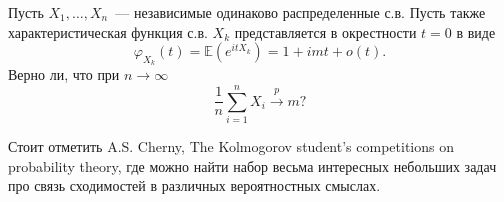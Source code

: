 \begin{problem}

Пусть $X_1,\ldots,X_n$~--- независимые одинаково распределенные с.в. Пусть также характеристическая функция с.в. $X_k$ представляется 
в окрестности $t=0$ в виде 
$$
\varphi_{X_k}(t)={\mathbb E}(e^{it X_k})=1+imt+o(t). 
$$
 Верно ли, что при $n\to\infty$ 
$$
\frac{1}{n}\sum\limits_{i=1}^{n} X_i \xrightarrow{p} m?
$$
\end{problem}
\begin{remark}
Стоит отметить A.S. Cherny, The Kolmogorov student's competitions on probability theory, где можно найти набор весьма интересных небольших задач про связь сходимостей в различных вероятностных смыслах.
\end{remark}

\begin{comment}
\begin{problem}
Пусть $x_1, x_2, x_3, \ldots$~--- последовательность независимых одинаково распределенных с.в. Положим 
$S_n=\sum\limits_{k=1}^{n} x_k$. Покажите, что 

\begin{enumerate}
\item(з.б.ч.) если ${\mathbb E}(|x_k|)<\infty$, то $S_n/n\xrightarrow{P} m$ при $n\to\infty$, где $m={\mathbb E}(x_k)$; 

\item(ц.п.т.) если ${\mathbb E}(x_k^2)<\infty$, то $(S_n-m\cdot n)/\sqrt{n\cdot D}\xrightarrow{d} N(0,1)$ при $n\to\infty$, 
где $D=\Var x_k$. 

\item(задача математической статистики) Предположим, что независимо $n$ раз кидается монетка с вероятностью выпадения орла в каждом 
опыте равной $p$ (точного значения $p$ мы не знаем, а знаем лишь то, что $0.1\leqslant p\leqslant 0.9$), т.е. $x_k\in\Be(p)$. 
Сколько раз нужно кинуть монетку (оцените $p$), чтобы оценка $${\bar p}(x)=\frac{\sum\limits_{k=1}^{n}x_k}{n}$$ с вероятностью 
$\gamma\geqslant 0.95$ отличалась от истинного значения $p$ не более, чем на величину $\delta=0.01$? Применить неравенство Чебышева 
и предельную теорему (точность, которую дает ц.п.т., оцените с помощью неравенства Берри – Эссена). Сравнить результаты. 
\end{enumerate}
\end{problem}

\begin{remark}
См. раздел \ref{measure}, задача \ref{sec:BerryEssen}

\end{remark}
\end{comment}

